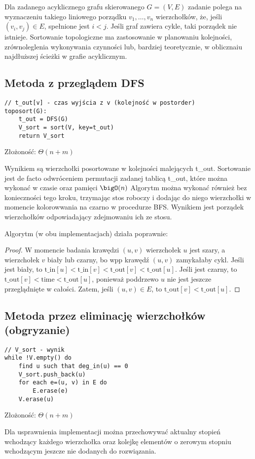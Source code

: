 Dla zadanego acyklicznego grafu skierowanego \( G=(V,E) \) zadanie polega na wyznaczeniu takiego liniowego porządku \( v_1, \dots, v_n \) wierzchołków,
że, jeśli \( (v_i, v_j) \in E \), spełnione jest \( i < j \). Jeśli graf zawiera cykle, taki porządek nie istnieje.
Sortowanie topologiczne ma zastosowanie w planowaniu kolejności, zrównoleglenia wykonywania czynności lub, bardziej teoretycznie, w oblicznaiu najdłuższej ścieżki w grafie acyklicznym.

\subsection{Metoda z przeglądem DFS}
\begin{verbatim}
// t_out[v] - czas wyjścia z v (kolejność w postorder)
toposort(G):
    t_out = DFS(G)
    V_sort = sort(V, key=t_out)
    return V_sort
\end{verbatim}
Złożoność: \( \Theta(n + m) \)

Wynikiem są wierzchołki posortowane w kolejności malejących t\_out. Sortowanie jest de facto odwróceniem permutacji zadanej tablicą t_out, które można wykonać w czasie oraz pamięci \( \bigO(n) \)
Algorytm można wykonać również bez konieczności tego kroku, trzymając stos roboczy i dodając do niego wierzchołki w momencie kolorowwania na czarno w procedurze BFS.
Wynikiem jest porządek wierzchołków odpowiadający zdejmowaniu ich ze stosu.

Algorytm (w obu implementacjach) działa poprawnie:
\begin{proof}
    W momencie badania krawędzi \( (u,v) \) wierzchołek  \( u \) jest szary, a wierzchołek \( v \) biały lub czarny, bo wpp krawędź \( (u, v) \) zamykałaby cykl.
    Jeśli jest biały, to \( \text{t\_in}[u] < \text{t\_in}[v] < \text{t\_out}[v] < \text{t\_out}[u] \).
    Jeśli jest czarny, to \( \text{t\_out}[v] < \text{time} < \text{t\_out}[u] \), ponieważ poddrzewo \( u \) nie jest jeszcze przeglądnięte w całości.
    Zatem, jeśli \( (u,v) \in E \), to \( \text{t\_out}[v] < \text{t\_out}[u] \).
\end{proof}

\subsection{Metoda przez eliminację wierzchołków (obgryzanie)}
\begin{verbatim}
// V_sort - wynik
while !V.empty() do
    find u such that deg_in(u) == 0
    V_sort.push_back(u)
    for each e=(u, v) in E do
        E.erase(e)
    V.erase(u)
\end{verbatim}
Złożoność: \( \Theta(n + m) \)

Dla usprawnienia implementacji można przechowywać aktualny stopień wchodzący każdego wierzchołka oraz kolejkę elementów o zerowym stopniu wchodzącym jeszcze nie dodanych do rozwiązania.